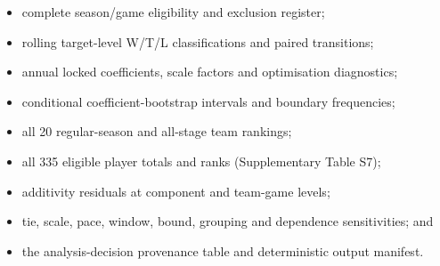 \documentclass[pdflatex,sn-mathphys-num]{sn-jnl}
\begin{document}
\begin{itemize}
\item complete season/game eligibility and exclusion register;
\item rolling target-level W/T/L classifications and paired transitions;
\item annual locked coefficients, scale factors and optimisation diagnostics;
\item conditional coefficient-bootstrap intervals and boundary frequencies;
\item all 20 regular-season and all-stage team rankings;
\item all 335 eligible player totals and ranks (Supplementary Table S7);
\item additivity residuals at component and team-game levels;
\item tie, scale, pace, window, bound, grouping and dependence sensitivities; and
\item the analysis-decision provenance table and deterministic output manifest.
\end{itemize}


\end{document}
